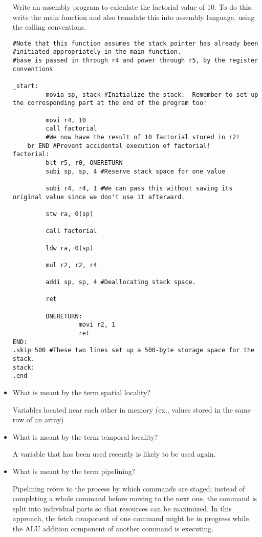 \documentclass[10pt]{article}
\begin{document}
\begin{itemize}
Write an assembly program to calculate the factorial value of 10.  To do this, write the main function and also translate this into assembly language, using the calling conventions.  
    \vspace{.5in}

    \begin{verbatim}
#Note that this function assumes the stack pointer has already been 
#initiated appropriately in the main function.
#base is passed in through r4 and power through r5, by the register conventions

_start:
         movia sp, stack #Initialize the stack.  Remember to set up the corresponding part at the end of the program too!

         movi r4, 10
         call factorial
         #We now have the result of 10 factorial stored in r2!
	br END #Prevent accidental execution of factorial!
factorial:
         blt r5, r0, ONERETURN
         subi sp, sp, 4 #Reserve stack space for one value

         subi r4, r4, 1 #We can pass this without saving its original value since we don't use it afterward.

         stw ra, 0(sp)

         call factorial

         ldw ra, 0(sp)

         mul r2, r2, r4

         addi sp, sp, 4 #Deallocating stack space.

         ret

         ONERETURN:
                  movi r2, 1
                  ret
END:
.skip 500 #These two lines set up a 500-byte storage space for the stack.
stack:
.end

    \end{verbatim}

\newpage


\item What is meant by the term spatial locality?

Variables located near each other in memory (ex., values stored in the same row of an array)

\item What is meant by the term temporal locality?

A variable that has been used recently is likely to be used again.

\item What is meant by the term pipelining?

Pipelining refers to the process by which commands are staged; instead of completing a whole command before moving to the next one, the command is split into individual parts so that resources can be maximized.  In this approach, the fetch component of one command might be in progress while the ALU addition component of another command is executing.


\end{itemize}
\end{document}
